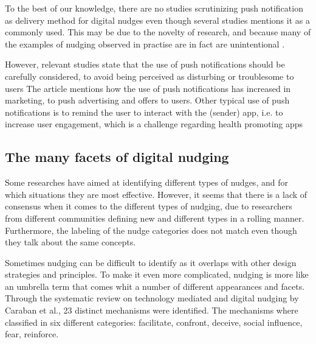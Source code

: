 To the best of our knowledge, there are no studies scrutinizing push notification as delivery method for digital nudges even though several studies mentions it as a commonly used\cite{dhar_persuasive_2017}. This may be due to the novelty of research, and because many of the examples of nudging observed in practise are in fact are unintentional \cite{mirsch_digital_2017}. 



However, relevant studies state that the use of push notifications should be carefully considered, to avoid being perceived as disturbing or troublesome to users \cite{warren_push_2014}
The article mentions how the use of push notifications has increased in marketing, to push advertising and offers to users. Other typical use of push notifications is to remind the user to interact with the (sender) app, i.e. to increase user engagement, which is a challenge regarding health promoting apps \cite{bidargaddi_prompt_2018}

\subsection{The many facets of digital nudging}
Some researches have aimed at identifying different types of nudges, and for which situations they are most effective. However, it seems that there is a lack of consensus when it comes to the different types of nudging, due to researchers from different communities defining new and different types in a rolling manner. Furthermore, the labeling of the nudge categories does not match even though they talk about the same concepts. 

Sometimes nudging can be difficult to identify as it overlaps with other design strategies and principles. To make it even more complicated, nudging is more like an umbrella term that comes whit a number of different appearances and facets. Through the systematic review on technology mediated and digital nudging by Caraban et al.\cite{caraban_23_2019}, 23 distinct mechanisms were identified. The mechanisms where classified in six different categories: facilitate, confront, deceive, social influence, fear, reinforce. 

